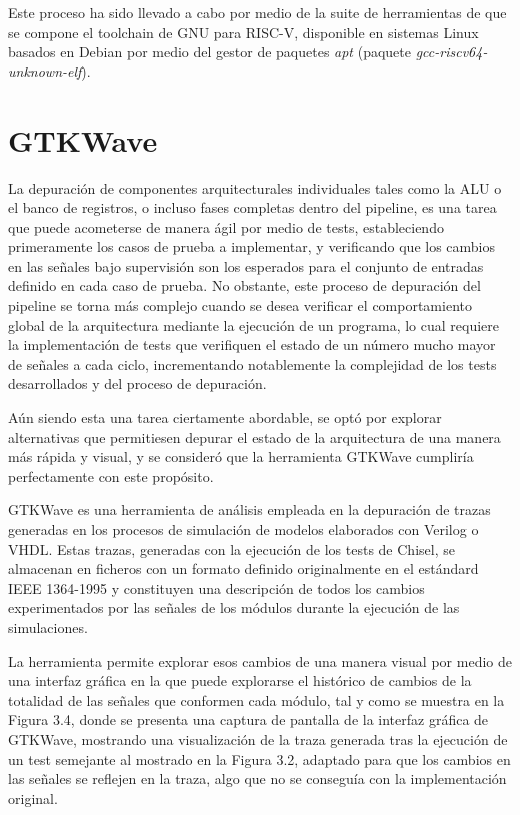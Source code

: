 Este proceso ha sido llevado a cabo por medio de la suite de herramientas de que se compone el toolchain de GNU para RISC-V\cite{riscvtoolchain}, disponible en sistemas Linux basados en Debian por medio del gestor de paquetes \textit{apt} (paquete \textit{gcc-riscv64-unknown-elf}).

\section{GTKWave}

La depuración de componentes arquitecturales individuales tales como la ALU o el banco de registros, o incluso fases completas dentro del pipeline, es una tarea que puede acometerse de manera ágil por medio de tests, estableciendo primeramente los casos de prueba a implementar, y verificando que los cambios en las señales bajo supervisión son los esperados para el conjunto de entradas definido en cada caso de prueba. No obstante, este proceso de depuración del pipeline se torna más complejo cuando se desea verificar el comportamiento global de la arquitectura mediante la ejecución de un programa, lo cual requiere la implementación de tests que verifiquen el estado de un número mucho mayor de señales a cada ciclo, incrementando notablemente la complejidad de los tests desarrollados y del proceso de depuración.

Aún siendo esta una tarea ciertamente abordable, se optó por explorar alternativas que permitiesen depurar el estado de la arquitectura de una manera más rápida y visual, y se consideró que la herramienta GTKWave cumpliría perfectamente con este propósito.

GTKWave es una herramienta de análisis empleada en la depuración de trazas generadas en los procesos de simulación de modelos elaborados con Verilog o VHDL. Estas trazas, generadas con la ejecución de los tests de Chisel, se almacenan en ficheros con un formato definido originalmente en el estándard IEEE 1364-1995\cite{IEEE1364} y constituyen una descripción de todos los cambios experimentados por las señales de los módulos durante la ejecución de las simulaciones.

La herramienta permite explorar esos cambios de una manera visual por medio de una interfaz gráfica en la que puede explorarse el histórico de cambios de la totalidad de las señales que conformen cada módulo, tal y como se muestra en la Figura 3.4, donde se presenta una captura de pantalla de la interfaz gráfica de GTKWave, mostrando una visualización de la traza generada tras la ejecución de un test semejante al mostrado en la Figura 3.2, adaptado para que los cambios en las señales se reflejen en la traza, algo que no se conseguía con la implementación original.

